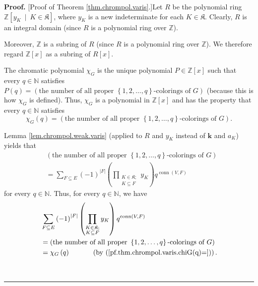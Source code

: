 \documentclass[numbers=enddot,12pt,final,onecolumn,notitlepage]{scrartcl}%
\theoremstyle{definition}
\newenvironment{proof}[1][Proof]{\noindent\textbf{#1.} }{\ \rule{0.5em}{0.5em}}
\newenvironment{verlong}{}{}
\let\sumnonlimits\sum
\let\prodnonlimits\prod
\renewcommand{\sum}{\sumnonlimits\limits}
\renewcommand{\prod}{\prodnonlimits\limits}
\begin{document}
\begin{verlong}
\begin{proof}
[Proof of Theorem \ref{thm.chrompol.varis}.]Let $R$ be the polynomial ring
$\mathbb{Z}\left[  y_{K}\ \mid\ K\in\mathfrak{K}\right]  $, where $y_{K}$ is a
new indeterminate for each $K\in\mathfrak{K}$. Clearly, $R$ is an integral
domain (since $R$ is a polynomial ring over $\mathbb{Z}$).

Moreover, $\mathbb{Z}$ is a subring of $R$ (since $R$ is a polynomial ring
over $\mathbb{Z}$). We therefore regard $\mathbb{Z}\left[  x\right]  $ as a
subring of $R\left[  x\right]  $.

The chromatic polynomial $\chi_{G}$ is the unique polynomial $P\in
\mathbb{Z}\left[  x\right]  $ such that every $q\in\mathbb{N}$ satisfies
$P\left(  q\right)  =\left(  \text{the number of all proper }\left\{
1,2,\ldots,q\right\}  \text{-colorings of }G\right)  $ (because this is how
$\chi_{G}$ is defined). Thus, $\chi_{G}$ is a polynomial in $\mathbb{Z}\left[
x\right]  $ and has the property that every $q\in\mathbb{N}$ satisfies%
\begin{equation}
\chi_{G}\left(  q\right)  =\left(  \text{the number of all proper }\left\{
1,2,\ldots,q\right\}  \text{-colorings of }G\right)  .
\label{pf.thm.chrompol.varis.chiG(q)=}%
\end{equation}


Lemma \ref{lem.chrompol.weak.varis} (applied to $R$ and $y_{K}$ instead of
$\mathbf{k}$ and $a_{K}$) yields that%
\begin{align*}
&  \left(  \text{the number of all proper }\left\{  1,2,\ldots,q\right\}
\text{-colorings of }G\right) \\
&  =\sum_{F\subseteq E}\left(  -1\right)  ^{\left\vert F\right\vert }\left(
\prod_{\substack{K\in\mathfrak{K};\\K\subseteq F}}y_{K}\right)
q^{\operatorname*{conn}\left(  V,F\right)  }%
\end{align*}
for every $q\in\mathbb{N}$. Thus, for every $q\in\mathbb{N}$, we have%
\begin{align}
&  \sum_{F\subseteq E}\left(  -1\right)  ^{\left\vert F\right\vert }\left(
\prod_{\substack{K\in\mathfrak{K};\\K\subseteq F}}y_{K}\right)
q^{\operatorname*{conn}\left(  V,F\right)  }\nonumber\\
&  =\left(  \text{the number of all proper }\left\{  1,2,\ldots,q\right\}
\text{-colorings of }G\right) \nonumber\\
&  =\chi_{G}\left(  q\right)  \ \ \ \ \ \ \ \ \ \ \left(  \text{by
(\ref{pf.thm.chrompol.varis.chiG(q)=})}\right)  .
\label{pf.thm.chrompol.varis.2}%
\end{align}



\end{proof}
\end{verlong}
\end{document}
